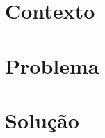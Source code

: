 \documentclass[a4paper,twoside,11pt]{article}
\begin{document}
    

    \section{Contexto}\label{sec:contexto}
    

    \section{Problema}\label{sec:problema}
    

    \section{Solução}\label{sec:solucao}
    

    
    
\end{document}
